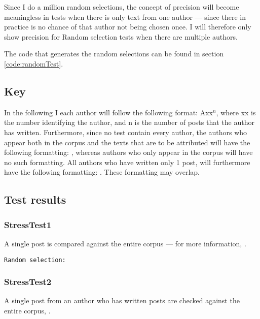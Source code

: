 Since I do a million random selections, the concept of precision will become meaningless in tests when there is only text from one author --- since there in practice is no chance of that author not being chosen once. I will therefore only show precision for Random selection tests when there are multiple authors. 

The code that generates the random selections can be found in section \ref{code:randomTest}.

\subsection*{Key}
In the following I each author will follow the following format: Axx$^{n}$, where xx is the number identifying the author, and n is the number of posts that the author has written. Furthermore, since no test contain every author, the authors who appear both in the corpus and the texts that are to be attributed will have the following formatting: , whereas authors who only appear in the corpus will have no such formatting. All authors who have written only 1 post, will furthermore have the following formatting: . These formatting may overlap.\\

\subsection{Test results}

\subsubsection{StressTest1}
A single post is compared against the entire corpus --- for more information, .\nl

\nl

\nl

\nl

\texttt{Random selection:}\nl


\subsubsection{StressTest2}
A single post from an author who has written  posts are checked against the entire corpus, .\\

